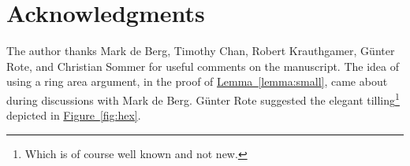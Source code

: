 \documentclass[12pt]{article}
\theoremstyle{remark}\theoremheaderfont{\sf}\theorembodyfont{\upshape}\newtheorem{defn}[theorem]{Definition}
\providecommand{\si}[1]{#1}
\newcommand{\HLink}[2]{\hyperref[#2]{#1~\ref*{#2}}}
\newcommand{\lemref}[1]{\HLink{Lemma}{lemma:#1}}
\newcommand{\figref}[1]{\HLink{Figure}{fig:#1}}
\begin{document}
\section*{Acknowledgments}
The author thanks Mark \si{de} Berg, Timothy Chan, Robert Krauthgamer,
G\"u\si{nter} Rote, and Christian Sommer for useful comments on the
manuscript. The idea of using a ring area argument, in the proof of
\lemref{small}, came about during discussions with Mark \si{de}
Berg. G\"u\si{nter} Rote suggested the elegant tilling\footnote{Which
   is of course well known and not new.} depicted in \figref{hex}.






\providecommand{\CNFX}[1]{ {\em{\textrm{(#1)}}}}
  \providecommand{\tildegen}{{\protect\raisebox{-0.1cm}{\symbol{'176}\hspace{-0.03cm}}}}
  \providecommand{\SarielWWWPapersAddr}{http://sarielhp.org/p/}
  \providecommand{\SarielWWWPapers}{http://sarielhp.org/p/}
  \providecommand{\urlSarielPaper}[1]{\href{\SarielWWWPapersAddr/#1}{\SarielWWWPapers{}/#1}}
  \providecommand{\Badoiu}{B\u{a}doiu}
  \providecommand{\Barany}{B{\'a}r{\'a}ny}
  \providecommand{\Bronimman}{Br{\"o}nnimann}  \providecommand{\Erdos}{Erd{\H
  o}s}  \providecommand{\Gartner}{G{\"a}rtner}
  \providecommand{\Matousek}{Matou{\v s}ek}
  \providecommand{\Merigot}{M{\'{}e}rigot}
  \providecommand{\CNFSoCG}{\CNFX{SoCG}}
  \providecommand{\CNFCCCG}{\CNFX{CCCG}}
  \providecommand{\CNFFOCS}{\CNFX{FOCS}}
  \providecommand{\CNFSODA}{\CNFX{SODA}}
  \providecommand{\CNFSTOC}{\CNFX{STOC}}
  \providecommand{\CNFBROADNETS}{\CNFX{BROADNETS}}
  \providecommand{\CNFESA}{\CNFX{ESA}}
  \providecommand{\CNFFSTTCS}{\CNFX{FSTTCS}}
  \providecommand{\CNFIJCAI}{\CNFX{IJCAI}}
  \providecommand{\CNFINFOCOM}{\CNFX{INFOCOM}}
  \providecommand{\CNFIPCO}{\CNFX{IPCO}}
  \providecommand{\CNFISAAC}{\CNFX{ISAAC}}
  \providecommand{\CNFLICS}{\CNFX{LICS}}
  \providecommand{\CNFPODS}{\CNFX{PODS}}
  \providecommand{\CNFSWAT}{\CNFX{SWAT}}
  \providecommand{\CNFWADS}{\CNFX{WADS}}
\end{document}
